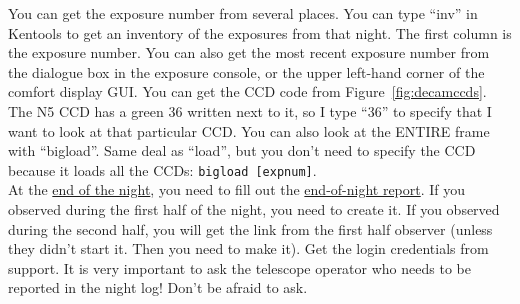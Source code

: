 You can get the exposure number from several places. You can type ``inv'' in Kentools to get an inventory of the exposures from that night. The first column is the exposure number. You can also get the most recent exposure number from the dialogue box in the exposure console, or the upper left-hand corner of the comfort display GUI. You can get the CCD code from Figure~\ref{fig:decamccds}. The N5 CCD has a green 36 written next to it, so I type ``36'' to specify that I want to look at that particular CCD. You can also look at the ENTIRE frame with ``bigload''. Same deal as ``load'', but you don't need to specify the CCD because it loads all the CCDs: \texttt{bigload [expnum]}. \\

At the \href{http://www.ctio.noao.edu/noao/content/End-Night-2}{end of the night}, you need to fill out the \href{http://www.ctio.noao.edu/noao/node/add/night-report}{end-of-night report}. If you observed during the first half of the night, you need to create it. If you observed during the second half, you will get the link from the first half observer (unless they didn't start it. Then you need to make it). Get the login credentials from support. It is very important to ask the telescope operator who needs to be reported in the night log! Don't be afraid to ask.\\

